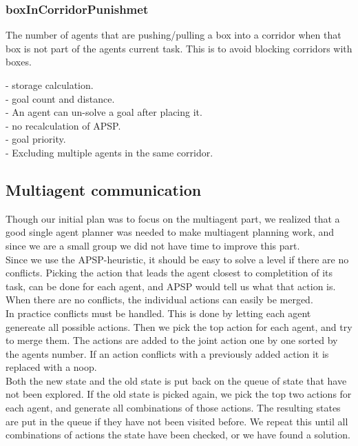 \documentclass[letterpaper]{article}
\begin{document}
\subsubsection{boxInCorridorPunishmet}
The number of agents that are pushing/pulling a box into a corridor when that box
is not part of the agents current task. This is to avoid blocking corridors with boxes.

- storage calculation.\\
- goal count and distance.\\
- An agent can un-solve a goal after placing it.\\
- no recalculation of APSP.\\
- goal priority.\\
- Excluding multiple agents in the same corridor.\\

\subsection{Multiagent communication}
Though our initial plan was to focus on the multiagent part, we realized that
a good single agent planner was needed to make multiagent planning work,
and since we are a small group we did not have time to improve this part.\\

Since we use the APSP-heuristic, it should be easy to solve a level if
there are no conflicts. Picking the action that leads
the agent closest to completition of its task, can be done for each agent,
and APSP would tell us what that action is. When there are no conflicts,
the individual actions can easily be merged.\\

In practice conflicts must be handled. This is done by letting each agent
genereate all possible actions. Then we pick the top action for each agent,
and try to merge them. The actions are added to the joint action one by one
sorted by the agents number. If an action conflicts with a previously added
action it is replaced with a noop.\\

Both the new state and the old state is put back on the queue of state that have
not been explored. If the old state is picked again, we pick the top two actions
for each agent, and generate all combinations of those actions. The resulting states
are put in the queue if they have not been visited before. We repeat this until
all combinations of actions the state have been checked, or we have found a solution.\\
\end{document}
